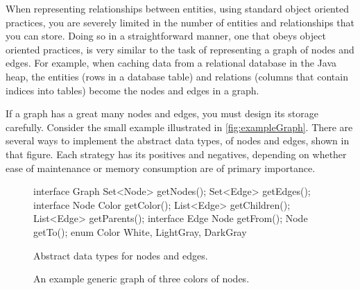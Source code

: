 When representing relationships between entities, using standard object oriented
practices, you are severely limited in the number of entities and relationships
that you can store. Doing so in a straightforward manner, one that obeys object
oriented practices, is very similar to the task of representing a graph of nodes
and edges. For example, when caching data from a relational database in the Java
heap, the entities (rows in a database table) and relations (columns that contain
indices into tables) become the nodes and edges in a graph.

If a graph has a great many nodes and edges, you must design its storage
carefully. Consider the small example illustrated in 
\autoref{fig:exampleGraph}. There are several ways to implement the abstract
data types, of nodes and edges, shown in that figure. Each strategy has its
positives and negatives, depending on whether ease of maintenance or memory
consumption are of primary importance.

\begin{figure}
\centering
{}
\begin{subfloat}
\label{fig:graph-interfaces}
\begin{minipage}[b]{0.65\textwidth}
\begin{shortlisting}
interface Graph {
	Set<Node> getNodes();
	Set<Edge> getEdges();
}
interface Node {
	Color getColor();
	List<Edge> getChildren();
	List<Edge> getParents();
}
interface Edge {
	Node getFrom();
	Node getTo();
}
enum Color {
	White, LightGray, DarkGray
}
\end{shortlisting}
\end{minipage}
\caption{Abstract data types for nodes and edges.}
\end{subfloat}
	\caption{An example generic graph of three colors of nodes.}
	\label{fig:exampleGraph}
\end{figure}

